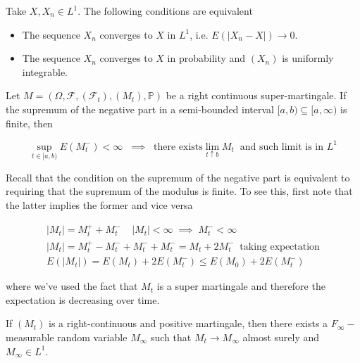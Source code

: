 \begin{theorem}
    Take $X,X_n \in L^1$. The following conditions are equivalent 
    \begin{itemize}
        \item The sequence $X_n$ converges to $X$ in $L^1$, i.e. $E(\vert X_n - X\vert) \to 0$. 
        \item The sequence $X_n$ converges to $X$ in probability and $(X_n)$ is uniformly integrable. 
    \end{itemize}
\end{theorem}

\begin{theorem}
    Let $M = (\Omega, \mathcal{F},(\mathcal{F}_t),(M_t),\mathbb{P})$ be a right continuous super-martingale. If the supremum of the negative part in a semi-bounded interval $[a,b) \subseteq [a,\infty)$ is finite, then

    \begin{equation*}
        \sup_{t \in [a,b)} E(M_t^-) < \infty \;\; \implies \;\; \text{there exists} \lim_{t \uparrow b} M_t \;\; \text{and such limit is in } L^1
    \end{equation*}
\end{theorem}

Recall that the condition on the supremum of the negative part is equivalent to requiring that the supremum of the modulus is finite. To see this, first note that the latter implies the former and vice versa

\begin{gather*}
    \vert M_t \vert = M_t^+ + M_t^- \;\;\;\; \vert M_t \vert < \infty \; \implies \; M_t^- < \infty \\
    \vert M_t \vert = M_t^+ - M_t^- + M_t^- + M_t^- = M_t + 2 M_t^- \;\; \text{taking expectation} \\
    E(\vert M_t \vert) = E(M_t) + 2 E(M_t^-) \leq E(M_0) + 2 E(M_t^-)
\end{gather*}

where we've used the fact that $M_t$ is a super martingale and therefore the expectation is decreasing over time. 

\begin{corollary}
    If $(M_t)$ is a right-continuous and positive martingale, then there exists a $F_{\infty}-$measurable random variable $M_{\infty}$ such that $M_t \to M_{\infty}$ almost surely and $M_{\infty} \in L^1$. 
\end{corollary}

